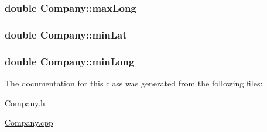 \subsubsection[{max\+Long}]{\setlength{\rightskip}{0pt plus 5cm}double Company\+::max\+Long\hspace{0.3cm}{\ttfamily [protected]}}\label{class_company_a465bc910733fc1433f3190e735989a92}
\hypertarget{class_company_a2284da8a5649f448ecef4e108981095d}{}
\subsubsection[{min\+Lat}]{\setlength{\rightskip}{0pt plus 5cm}double Company\+::min\+Lat\hspace{0.3cm}{\ttfamily [protected]}}\label{class_company_a2284da8a5649f448ecef4e108981095d}
\hypertarget{class_company_aee15fab58f5a645e3f088c5ef886d7b6}{}
\subsubsection[{min\+Long}]{\setlength{\rightskip}{0pt plus 5cm}double Company\+::min\+Long\hspace{0.3cm}{\ttfamily [protected]}}\label{class_company_aee15fab58f5a645e3f088c5ef886d7b6}


The documentation for this class was generated from the following files\+:\begin{DoxyCompactItemize}
\item 
\hyperlink{_company_8h}{Company.\+h}\item 
\hyperlink{_company_8cpp}{Company.\+cpp}\end{DoxyCompactItemize}
